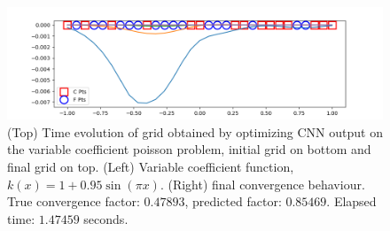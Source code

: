 \begin{figure}[h]
  \includegraphics[scale=0.3]{figures/grid-opt/poisson_sine_grid_conv.png}
  \caption{(Top) Time evolution of grid obtained by optimizing CNN output on the variable coefficient poisson problem, initial grid on bottom and final grid on top.  (Left) Variable coefficient function, $k(x)=1+0.95\sin\left(\pi x\right)$.  (Right) final convergence behaviour.  True convergence factor: $0.47893$, predicted factor: $0.85469$.  Elapsed time: $1.47459$ seconds.  }
  \label{fig:optimized_grid_varcoeff}
\end{figure}



\nocite{*}




